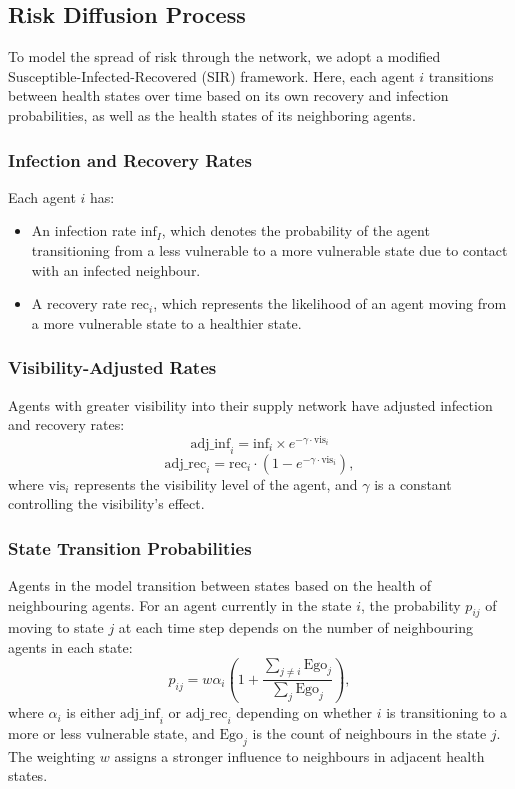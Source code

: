 \documentclass{article}
\begin{document}
\subsection{Risk Diffusion Process}
To model the spread of risk through the network, we adopt a modified Susceptible-Infected-Recovered (SIR) framework. Here, each agent \( i \) transitions between health states over time based on its own recovery and infection probabilities, as well as the health states of its neighboring agents.

\subsubsection{Infection and Recovery Rates}
Each agent \( i \) has:
\begin{itemize}
    \item An infection rate \( \text{inf}_I \), which denotes the probability of the agent transitioning from a less vulnerable to a more vulnerable state due to contact with an infected neighbour.
    \item A recovery rate \( \text{rec}_i \), which represents the likelihood of an agent moving from a more vulnerable state to a healthier state.
\end{itemize}

\subsubsection{Visibility-Adjusted Rates}
Agents with greater visibility into their supply network have adjusted infection and recovery rates:
\[
\text{adj\_inf}_i = \text{inf}_i \times e^{-\gamma \cdot \text{vis}_i}
\]
\[
\text{adj\_rec}_i = \text{rec}_i \cdot \left( 1 - e^{-\gamma \cdot \text{vis}_i} \right),
\]
where \( \text{vis}_i \) represents the visibility level of the agent, and \( \gamma \) is a constant controlling the visibility's effect.

\subsubsection{State Transition Probabilities}
Agents in the model transition between states based on the health of neighbouring agents. For an agent currently in the state \( i \), the probability \( p_{ij} \) of moving to state \( j \) at each time step depends on the number of neighbouring agents in each state:
\[
p_{ij} = w \alpha_i \left( 1 + \frac{\sum_{j \neq i} \text{Ego}_j}{\sum_j \text{Ego}_j} \right),
\]
where \( \alpha_i \) is either \( \text{adj\_inf}_i \) or \( \text{adj\_rec}_i \) depending on whether \( i \) is transitioning to a more or less vulnerable state, and \( \text{Ego}_j \) is the count of neighbours in the state \( j \). The weighting \( w \) assigns a stronger influence to neighbours in adjacent health states.
\end{document}
